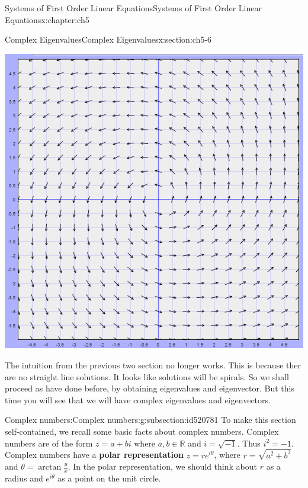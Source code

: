 \documentclass[oneside,10pt,]{book}
\newcommand{\terminology}[1]{\textbf{#1}}
\numberwithin{equation}{section}
\numberwithin{equation}{section}
\begin{document}
\begin{chapterptx}{Systems of First Order Linear Equations}{}{Systems of First Order Linear Equations}{}{}{x:chapter:ch5}
\begin{sectionptx}{Complex Eigenvalues}{}{Complex Eigenvalues}{}{}{x:section:ch5-6}
\begin{introduction}{}
\par
\begin{image}{0}{1}{0}%
\includegraphics[width=\linewidth]{images/3.4-pic1.png}
\end{image}%
%
\par
The intuition from the previous two section no longer works. This is because ther are no straight line solutions. It looks like solutions will be spirals. So we shall proceed as have done before, by obtaining eigenvalues and eigenvector. But this time you will see that we will have complex eigenvalues and eigenvectors.%
\end{introduction}%
%
%
\typeout{************************************************}
\typeout{************************************************}
%
\begin{subsectionptx}{Complex numbers:}{}{Complex numbers:}{}{}{g:subsection:id520781}
To make this section self-contained, we recall some basic facts about complex numbers. Complex numbers are of the form \(z = a+bi\) where \(a,b\in\mathbb{R}\) and \(i=\sqrt{-1}\). Thus \(i^{2}=-1\). Complex numbers have a \terminology{polar representation} \(z = r e^{i\theta}\), where \(r = \sqrt{a^2 + b^2}\) and \(\theta = \arctan\frac{y}{x}\). In the polar representation, we should think about \(r\) as a radius and \(e^{i\theta}\) as a point on the unit circle.%

\end{subsectionptx}
\end{sectionptx}
\end{chapterptx}
\end{document}
